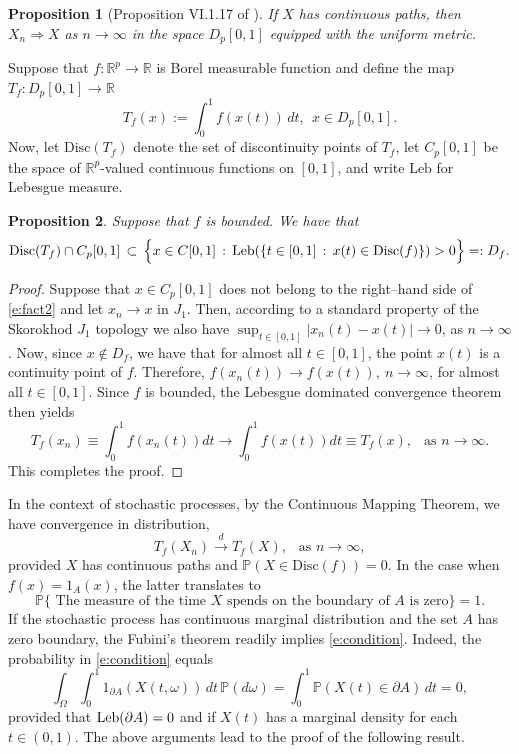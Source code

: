 \documentclass[11pt]{article}
\newcommand\prob{\mathbb{P}}
\def\R{\mathbb{R}}
\newtheorem{prop}{Proposition}
\newcommand\Disc{\mathrm{Disc}}
\begin{document}
\begin{prop}[Proposition VI.1.17 of \cite{jacod87}]
If $X$ has continuous paths, then $X_n \Rightarrow X$ as $n\to\infty$ in the space $D_p[0,1]$ equipped with the 
uniform metric. 
\end{prop}
Suppose that $f:\R^p \to \R$ is Borel measurable function and define the map $T_f:D_p[0,1]\to \R$
\begin{equation}\nonumber
 T_f(x) := \int_0^1 f(x(t))\, dt,\ \ x\in D_p[0,1].
\end{equation}
Now, let  $\Disc(T_f)$ denote the set of discontinuity points of $T_f$, let $C_p[0,1]$ be the space of $\R^p$-valued continuous functions on $[0,1]$, and write $\mathrm{Leb}$ for Lebesgue measure. 

\begin{prop} Suppose that $f$ is bounded. We have that
\begin{equation}\label{e:fact2}
\Disc (T_f) \cap C_p[0,1] \, \subset \, {\Big\{} x \in C[0,1]\, :\, {\rm Leb}(\{t\in [0,1]\, :\, x(t) \in \Disc(f) \})>0 {\Big\}} =:D_f.
\end{equation}
\end{prop}
\begin{proof}
Suppose that $x \in C_p[0,1]$ does not belong to the right--hand side of \eqref{e:fact2} and let
$x_n\to x$ in $J_1$. Then, according to a standard property of the Skorokhod $J_1$ topology \cite{jacod87}
we also have $\sup_{t\in [0,1]} |x_n(t) - x(t)| \to 0$, as $n\to\infty$. Now, since $x\not \in D_f$, we have that 
for almost all $t\in [0,1]$, the point $x(t)$ is a continuity point of $f$. Therefore, $f(x_n(t)) \to f(x(t)),\ n\to\infty$,
for almost all $t\in [0,1]$. Since $f$ is bounded, the Lebesgue dominated convergence theorem then yields
\begin{equation}\nonumber
T_f(x_n) \equiv  \int_0^1 f(x_n(t)) dt \longrightarrow \int_0^1 f(x(t))dt \equiv T_f(x),\ \ \mbox { as }n\to\infty.
\end{equation}
This completes the proof. 
\end{proof}
In the context of stochastic processes, by the Continuous Mapping Theorem, we have convergence in distribution,
\begin{equation*}
 T_f(X_n) \stackrel{d}{\longrightarrow} T_f(X),\ \ \mbox{ as }n\to\infty,
\end{equation*}
provided $X$ has continuous paths and $\prob (X \in \Disc(f))  = 0$. In the case when $f(x) = 1_A(x)$, the latter translates to
\begin{equation}\label{e:condition}
 \prob\{ \mbox{ The measure of the time $X$ spends on the boundary of $A$ is zero}\}  = 1.
\end{equation}
If the stochastic process has continuous marginal distribution and the set $A$ has zero boundary, the Fubini's theorem readily implies
\eqref{e:condition}. Indeed, the probability in \eqref{e:condition} equals
$$
\int_{\Omega}  \int_{0}^1 1_{\partial A}(X(t,\omega )) \, dt \, \prob(d\omega) = \int_0^1 \prob (X(t) \in \partial A) \, dt = 0, 
$$
provided that ${\rm Leb}(\partial A) =0$ and if $X(t)$ has a marginal density for each $t\in (0,1)$.
The above arguments lead to the proof of the following result.
\end{document}
